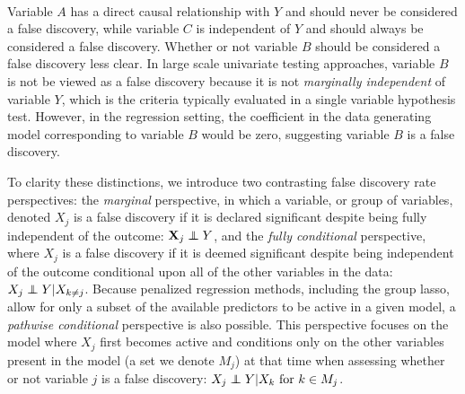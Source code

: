 \begin{center}
 \\
\end{center}

Variable $A$ has a direct causal relationship with $Y$ and should never be considered a false discovery, while variable $C$ is independent of $Y$ and should always be considered a false discovery. Whether or not variable $B$ should be considered a false discovery less clear. In large scale univariate testing approaches, variable $B$ is not be viewed as a false discovery because it is not \textit{marginally independent} of variable $Y$, which is the criteria typically evaluated in a single variable hypothesis test. However, in the regression setting, the coefficient in the data generating model corresponding to variable $B$ would be zero, suggesting variable $B$ is a false discovery.

To clarity these distinctions, we introduce two contrasting false discovery rate perspectives: the \textit{marginal} perspective, in which a variable, or group of variables, denoted $X_j$ is a false discovery if it is declared significant despite being fully independent of the outcome: $\X_j \independent Y$, and the \textit{fully conditional} perspective, where $X_j$ is a false discovery if it is deemed significant despite being independent of the outcome conditional upon all of the other variables in the data: $X_j \independent Y | X_{k \neq j}$. Because penalized regression methods, including the group lasso, allow for only a subset of the available predictors to be active in a given model, a \textit{pathwise conditional} perspective is also possible. This perspective focuses on the model where $X_j$ first becomes active and conditions only on the other variables present in the model (a set we denote $M_j$) at that time when assessing whether or not variable $j$ is a false discovery: $X_j \independent Y | X_k \text{ for } k \in M_j$.

